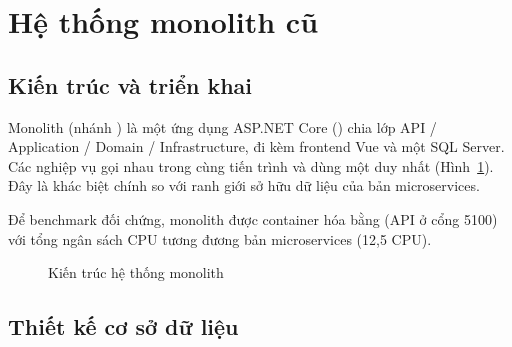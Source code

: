 \section{Hệ thống monolith cũ}
\label{ch:monolith}

\subsection{Kiến trúc và triển khai}

Monolith (nhánh ) là một ứng dụng ASP.NET Core () chia lớp API / Application / Domain / Infrastructure, đi kèm frontend Vue và một SQL Server. Các nghiệp vụ gọi nhau trong cùng tiến trình và dùng một  duy nhất (Hình~\ref{fig:monolith}). Đây là khác biệt chính so với ranh giới sở hữu dữ liệu của bản microservices.

Để benchmark đối chứng, monolith được container hóa bằng  (API ở cổng 5100) với tổng ngân sách CPU tương đương bản microservices (12,5 CPU).

\begin{figure}[!t]
\centering
{}
\caption{Kiến trúc hệ thống monolith}
\label{fig:monolith}
\end{figure}

\subsection{Thiết kế cơ sở dữ liệu}

